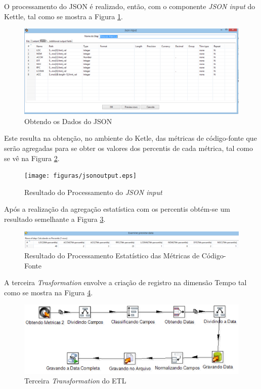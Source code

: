 \begin{apendicesenv}
O processamento do JSON é realizado, então, com o componente \textit{JSON input} do Kettle, tal como se mostra a Figura \ref{dadosjson}.



\begin{figure}[ht!]
\centering
\includegraphics[keepaspectratio=false,scale=0.55]{figuras/dadosjson.eps}
\caption{Obtendo os Dados do JSON}
\label{dadosjson}
\end{figure}
\FloatBarrier

Este resulta na obtenção, no ambiente do Ketle, das métricas de código-fonte que serão agregadas para se obter os valores dos percentis de cada métrica, tal como se vê na Figura \ref{jsonoutput}.


\begin{figure}[ht!]
\centering
\texttt{[image: figuras/jsonoutput.eps]}
\caption{Resultado do Processamento do \textit{JSON input}}
\label{jsonoutput}
\end{figure}
\FloatBarrier

Após a realização da agregação estatística com os percentis obtém-se um resultado semelhante a Figura \ref{percentils}.


\begin{figure}[ht!]
\centering
\includegraphics[keepaspectratio=false,scale=0.50]{figuras/percentils.eps}
\caption{Resultado do Processamento Estatístico das Métricas de Código-Fonte}
\label{percentils}
\end{figure}
\FloatBarrier

A terceira \textit{Trasformation} envolve a criação de registro na dimensão Tempo tal como se mostra na Figura \ref{third}.


\begin{figure}[ht!]
\centering
\includegraphics[keepaspectratio=false,scale=0.85]{figuras/third.eps}
\caption{Terceira \textit{Transformation} do ETL}
\label{third}
\end{figure}
\FloatBarrier


\end{apendicesenv}
